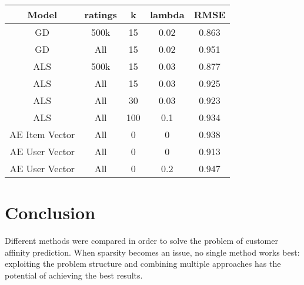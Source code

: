 \documentclass[10pt,twocolumn]{article}
\begin{document}
\vspace{0.5cm}

\begin{center}
    \begin{tabular}{|c|c|c|c|c|}
       \hline
       Model & ratings & k & lambda  & RMSE \\
       \hline
       GD  & 500k & 15 & 0.02 & 0.863 \\
	   GD & All & 15 & 0.02 &  0.951 \\
       ALS & 500k & 15 & 0.03 & 0.877 \\
	   ALS & All &  15  &  0.03 & 0.925 \\
       ALS & All & 30 & 0.03 &  0.923 \\
   	   ALS & All &  100  &  0.1 &   0.934 \\
   	   AE Item Vector &  All & 0 & 0 & 0.938 \\
       AE User Vector &  All &  0  &  0 & 0.913 \\
	   AE User Vector &  All &  0  &  0.2 & 0.947 \\

       \hline
    \end{tabular}
  \end{center}

\section{Conclusion}

Different methods were compared in order to solve the problem of customer affinity prediction. When sparsity becomes an issue, no single method works best: exploiting the problem structure and combining multiple approaches has the potential of achieving the best results.


\end{document}
